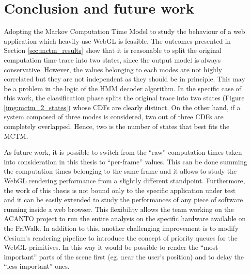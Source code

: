 \chapter{Conclusion and future work} \label{cha:conclusion}

Adopting the Markov Computation Time Model to study the behaviour of a web
application which heavily use WebGL is feasible.
The outcomes presented in Section \ref{sec:mctm_results} show that it is
reasonable to split the original computation time trace into two states, since
the output model is always conservative.
However, the values belonging to each modes are not highly correlated but they
are not independent as they should be in principle.
This may be a problem in the logic of the HMM decoder algorithm. In the specific
case of this work, the classification phase splits the original trace into two
states (Figure \ref{img:mctm_2_states}) whose CDFs are clearly distinct. On the
other hand, if a system composed of three modes is considered, two out of three
CDFs are completely overlapped. Hence, two is the number of states that best
fits the MCTM.

As future work, it is possible to switch from the ``raw'' computation times taken
into consideration in this thesis to ``per-frame'' values. This can be done
summing the computation times belonging to the same frame and it allows to study
the WebGL rendering performance from a slightly different standpoint.
Furthermore, the work of this thesis is not bound only to the specific
application under test and it can be easily extended to study the performances
of any piece of software running inside a web browser. This flexibility allows
the team working on the ACANTO project to run the entire analysis on the
specific hardware available on the FriWalk. In addition to this, another
challenging improvement is to modify Cesium's rendering pipeline to introduce
the concept of priority queues for the WebGL primitives. In this way it would
be possible to render the ``most important'' parts of the scene first (eg. near
the user's position) and to delay the ``less important'' ones.
